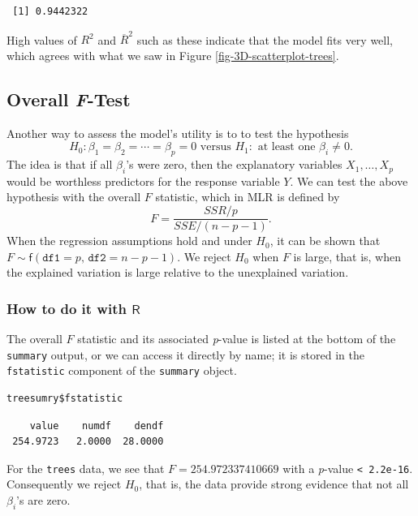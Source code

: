\documentclass[captions=tableheading]{scrbook}
\begin{document}
\begin{verbatim}
 [1] 0.9442322
\end{verbatim}

High values of \(R^{2}\) and \( \overline{R}^2 \) such as these indicate that the model fits very well, which agrees with what we saw in Figure \ref{fig-3D-scatterplot-trees}.
\subsection{Overall \emph{F}-Test}
\label{sec-12-3-2}
\label{sub-mlr-Overall-F-Test}


Another way to assess the model's utility is to to test the hypothesis
\[
H_{0}:\beta_{1}=\beta_{2}=\cdots=\beta_{p}=0\mbox{ versus }H_{1}:\mbox{ at least one $\beta_{i}\neq0$}.
\]
The idea is that if all \(\beta_{i}\)'s were zero, then the explanatory variables \(X_{1},\ldots,X_{p}\) would be worthless predictors for the response variable \(Y\). We can test the above hypothesis with the overall \(F\) statistic, which in MLR is defined by
\begin{equation}
F=\frac{SSR/p}{SSE/(n-p-1)}.
\end{equation}
When the regression assumptions hold and under \(H_{0}\), it can be shown that \(F\sim\mathsf{f}(\mathtt{df1}=p,\,\mathtt{df2}=n-p-1)\). We reject \(H_{0}\) when \(F\) is large, that is, when the explained variation is large relative to the unexplained variation.
\subsubsection{How to do it with \(\mathsf{R}\)}
\label{sec-12-3-2-1}


The overall \(F\) statistic and its associated \emph{p}-value is listed at the bottom of the \texttt{summary} output, or we can access it directly by name; it is stored in the \texttt{fstatistic} component of the \texttt{summary} object. 


\begin{verbatim}
treesumry$fstatistic
\end{verbatim}

\begin{verbatim}
    value    numdf    dendf 
 254.9723   2.0000  28.0000
\end{verbatim}

For the \texttt{trees} data, we see that \( F =  254.972337410669 \) with a \emph{p}-value \texttt{< 2.2e-16}. Consequently we reject \(H_{0}\), that is, the data provide strong evidence that not all \(\beta_{i}\)'s are zero.
\end{document}
